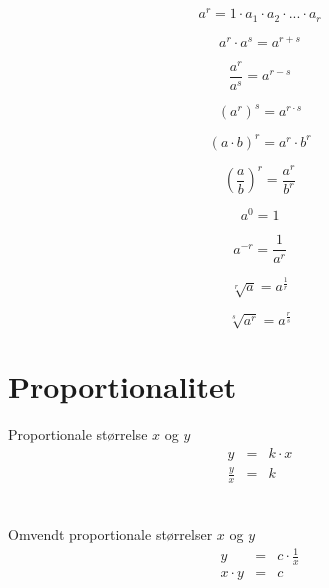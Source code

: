 \documentclass[11pt,a5paper,fleqn,leqno]{book}
\begin{document}
\begin{equation} \label{eq:potens}
a^r = 1 \cdot a_1 \cdot a_2 \cdot ... \cdot a_r
\end{equation}

\begin{equation} \label{eq:potens_gange}
a^r \cdot a^s = a^{r+s}
\end{equation}

\begin{equation} \label{eq:potens_dividere}
\dfrac{a^r}{a^s} = a^{r-s}
\end{equation}

\begin{equation} \label{eq:potens_potens}
\left(a^r\right)^s = a^{r \cdot s}
\end{equation}

\begin{equation} \label{eq:potens_faktorer}
\left(a \cdot b\right)^{r} = a^{r} \cdot b^{r}
\end{equation}

\begin{equation} \label{eq:potens_divisor}
\left(\dfrac{a}{b}\right)^{r} = \dfrac{a^{r}}{b^{r}}
\end{equation}

\begin{equation} \label{eq:potens_nulte}
a^{0} = 1
\end{equation}

\begin{equation} \label{eq:potens_minuste}
a^{-r} = \dfrac{1}{a^{r}}
\end{equation}

\begin{equation} \label{eq:potens_kvadratrod}
\sqrt[r]{a} = a^{\frac{1}{r}}
\end{equation}

\begin{equation} \label{eq:potens_kvadratrod_potens}
\sqrt[s]{a^{r}} = a^{\frac{r}{s}}
\end{equation}

\vfill

\section{Proportionalitet}

Proportionale størrelse $x$ og $y$
\begin{eqnarray}
y & =&  k \cdot x \\
\frac{y}{x} & = & k \nonumber
\end{eqnarray}
\\
\\
Omvendt proportionale størrelser $x$ og $y$
\begin{eqnarray}
y & = & c \cdot \frac{1}{x} \\
x \cdot y & = & c \nonumber
\end{eqnarray}
\end{document}
